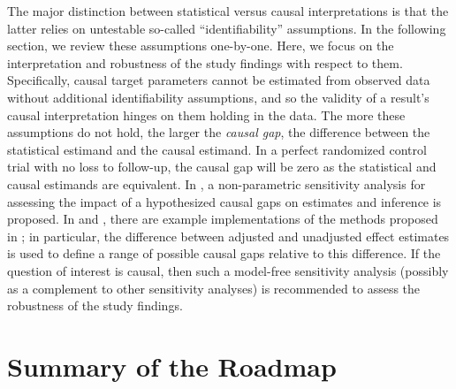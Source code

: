 \documentclass[
  12pt, krantz2,
]{krantz}
\newcommand{\1}{\mathbbm{1}}
\theoremstyle{definition}
\theoremstyle{definition}
\theoremstyle{definition}
\theoremstyle{definition}
\theoremstyle{remark}
\begin{document}
The major distinction between statistical versus causal interpretations is that
the latter relies on untestable so-called ``identifiability'' assumptions. In the
following section, we review these assumptions one-by-one. Here, we focus on the
interpretation and robustness of the study findings with respect to them.
Specifically, causal target parameters cannot be estimated from observed data
without additional identifiability assumptions, and so the validity of a
result's causal interpretation hinges on them holding in the data. The more
these assumptions do not hold, the larger the \emph{causal gap}, the difference
between the statistical estimand and the causal estimand. In a perfect
randomized control trial with no loss to follow-up, the causal gap will be zero
as the statistical and causal estimands are equivalent. In \citet{diaz2013sensitivity},
a non-parametric sensitivity analysis for assessing the impact of a hypothesized
causal gaps on estimates and inference is proposed. In \citet{gruber2022targeted} and
\citet{gruber2022evaluating}, there are example implementations of the methods proposed
in \citet{diaz2013sensitivity}; in particular, the difference between adjusted and
unadjusted effect estimates is used to define a range of possible causal gaps
relative to this difference. If the question of interest is causal, then such a
model-free sensitivity analysis (possibly as a complement to other sensitivity
analyses) is recommended to assess the robustness of the study findings.

\hypertarget{roadmap-summary}{%
\section{Summary of the Roadmap}\label{roadmap-summary}}
\end{document}
